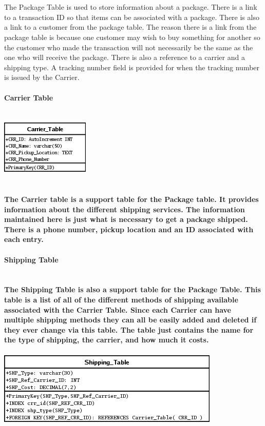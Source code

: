 \documentclass{report}
\begin{document}
	\\
	\\
	The Package Table is used to store information about a package. There is a link to a transaction ID
	so that items can be associated with a package. There is also a link to a customer from the package
	table. The reason there is a link from the package table is because one customer may wish to buy
	something for another so the customer who made the transaction will not necessarily be the same as
	the one who will receive the package. There is also a reference to a carrier and a shipping type.
	A tracking number field is provided for when the tracking number is issued by the Carrier.
	\\
	\\
	\bf{Carrier Table}\\
	\\
	\\
	\includegraphics{Tables/CarrierTable.png}\\
	\\
	\\
	The Carrier table is a support table for the Package table. It provides information about the different
	shipping services. The information maintained here is just what is necessary to get a package shipped.
	There is a phone number, pickup location and an ID associated with each entry.
	\\
	\\
	\bf{Shipping Table}\\
	\\
	\\
	The Shipping Table is also a support table for the Package Table. This table is a list of all of the
	different methods of shipping available associated with the Carrier Table. Since each Carrier can
	have multiple shipping methods they can all be easily added and deleted if they ever change via
	this table. The table just contains the name for the type of shipping, the carrier, and how much
	it costs.\\
	\\
	\includegraphics{Tables/ShippingTable.png}\\
	\\
\end{document}
